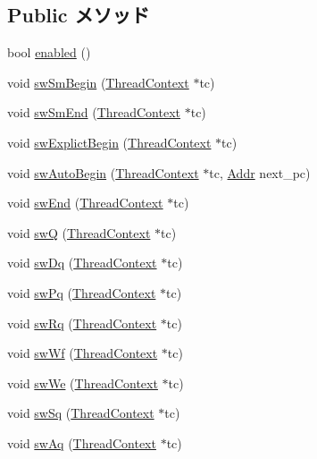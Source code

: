 \subsection*{Public メソッド}
\begin{DoxyCompactItemize}
\item 
bool \hyperlink{classCPA_acafb7271189f6d844921794d61cd608a}{enabled} ()
\item 
void \hyperlink{classCPA_a7427babcf2e82bc186486c0163ccfb0f}{swSmBegin} (\hyperlink{classThreadContext}{ThreadContext} $\ast$tc)
\item 
void \hyperlink{classCPA_a9e02cda5650796a3814bd7f448988423}{swSmEnd} (\hyperlink{classThreadContext}{ThreadContext} $\ast$tc)
\item 
void \hyperlink{classCPA_aa45d330146020f18a5fc68f435bc1154}{swExplictBegin} (\hyperlink{classThreadContext}{ThreadContext} $\ast$tc)
\item 
void \hyperlink{classCPA_aa8ccd90dbd2c58f74d1b0bdc10690c98}{swAutoBegin} (\hyperlink{classThreadContext}{ThreadContext} $\ast$tc, \hyperlink{base_2types_8hh_af1bb03d6a4ee096394a6749f0a169232}{Addr} next\_\-pc)
\item 
void \hyperlink{classCPA_a5473221a1c243bdd4d84c21ec1270f9e}{swEnd} (\hyperlink{classThreadContext}{ThreadContext} $\ast$tc)
\item 
void \hyperlink{classCPA_afd13c108f3eb70425cedf08b2ec581bd}{swQ} (\hyperlink{classThreadContext}{ThreadContext} $\ast$tc)
\item 
void \hyperlink{classCPA_a759a46e423c6c00777c90f1cac3fcef7}{swDq} (\hyperlink{classThreadContext}{ThreadContext} $\ast$tc)
\item 
void \hyperlink{classCPA_a7f718c1ae3fd9d9e9b5e8b3eecc9d653}{swPq} (\hyperlink{classThreadContext}{ThreadContext} $\ast$tc)
\item 
void \hyperlink{classCPA_ab92d30bfa0f9bc12c3077f46edc3eafc}{swRq} (\hyperlink{classThreadContext}{ThreadContext} $\ast$tc)
\item 
void \hyperlink{classCPA_aca9bb707d81369735abc9ed6f1a7149a}{swWf} (\hyperlink{classThreadContext}{ThreadContext} $\ast$tc)
\item 
void \hyperlink{classCPA_a0e6dd13c9f0caea571fa9eaabf785f60}{swWe} (\hyperlink{classThreadContext}{ThreadContext} $\ast$tc)
\item 
void \hyperlink{classCPA_af481dac3d5349528119d190eaafafe5d}{swSq} (\hyperlink{classThreadContext}{ThreadContext} $\ast$tc)
\item 
void \hyperlink{classCPA_ae25580c3c1a90a6979ca6ef3c737f91b}{swAq} (\hyperlink{classThreadContext}{ThreadContext} $\ast$tc)

\end{DoxyCompactItemize}
